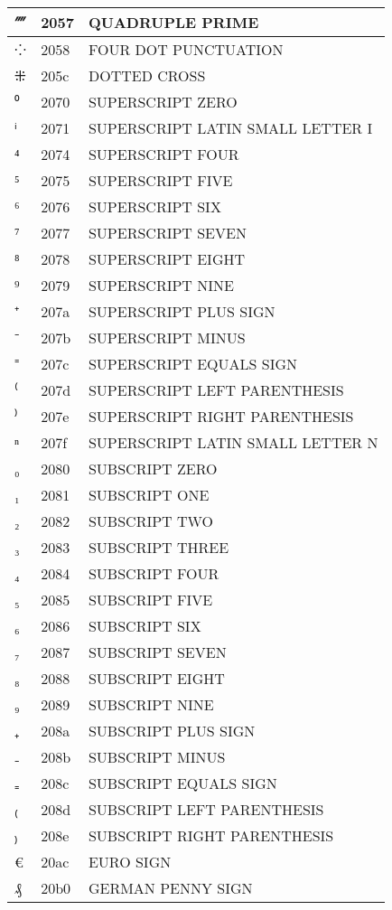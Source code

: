 \documentclass[12pt,letterpaper,openany]{book}
\begin{document}
\begin{center}
\begin{supertabular}{|m{0.25in}|m{0.5in}|m{4in}|}
⁗ & 2057 & QUADRUPLE PRIME\\\hline
⁘ & 2058 & FOUR DOT PUNCTUATION\\\hline
⁜ & 205c & DOTTED CROSS\\\hline
⁰ & 2070 & SUPERSCRIPT ZERO\\\hline
ⁱ & 2071 & SUPERSCRIPT LATIN SMALL LETTER I\\\hline
⁴ & 2074 & SUPERSCRIPT FOUR\\\hline
⁵ & 2075 & SUPERSCRIPT FIVE\\\hline
⁶ & 2076 & SUPERSCRIPT SIX\\\hline
⁷ & 2077 & SUPERSCRIPT SEVEN\\\hline
⁸ & 2078 & SUPERSCRIPT EIGHT\\\hline
⁹ & 2079 & SUPERSCRIPT NINE\\\hline
⁺ & 207a & SUPERSCRIPT PLUS SIGN\\\hline
⁻ & 207b & SUPERSCRIPT MINUS\\\hline
⁼ & 207c & SUPERSCRIPT EQUALS SIGN\\\hline
⁽ & 207d & SUPERSCRIPT LEFT PARENTHESIS\\\hline
⁾ & 207e & SUPERSCRIPT RIGHT PARENTHESIS\\\hline
ⁿ & 207f & SUPERSCRIPT LATIN SMALL LETTER N\\\hline
₀ & 2080 & SUBSCRIPT ZERO\\\hline
₁ & 2081 & SUBSCRIPT ONE\\\hline
₂ & 2082 & SUBSCRIPT TWO\\\hline
₃ & 2083 & SUBSCRIPT THREE\\\hline
₄ & 2084 & SUBSCRIPT FOUR\\\hline
₅ & 2085 & SUBSCRIPT FIVE\\\hline
₆ & 2086 & SUBSCRIPT SIX\\\hline
₇ & 2087 & SUBSCRIPT SEVEN\\\hline
₈ & 2088 & SUBSCRIPT EIGHT\\\hline
₉ & 2089 & SUBSCRIPT NINE\\\hline
₊ & 208a & SUBSCRIPT PLUS SIGN\\\hline
₋ & 208b & SUBSCRIPT MINUS\\\hline
₌ & 208c & SUBSCRIPT EQUALS SIGN\\\hline
₍ & 208d & SUBSCRIPT LEFT PARENTHESIS\\\hline
₎ & 208e & SUBSCRIPT RIGHT PARENTHESIS\\\hline
€ & 20ac & EURO SIGN\\\hline
₰ & 20b0 & GERMAN PENNY SIGN\\\hline

\end{supertabular}
\end{center}
\end{document}
